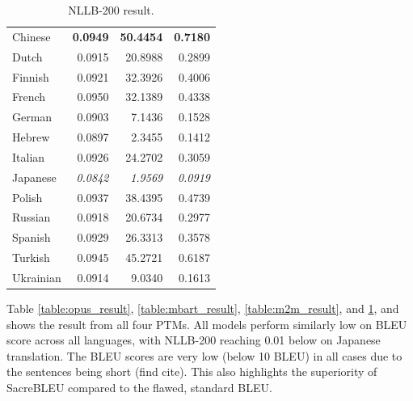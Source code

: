 \documentclass[a4paper, 11pt]{article}
\begin{document}
\begin{table}[htbp]
\begin{minipage}{0.49\linewidth}
\begin{tabular}{lrrr}
            \hline
            Chinese           & \textbf{0.0949} & \textbf{50.4454}   & \textbf{0.7180} \\
            Dutch             & 0.0915          & 20.8988            & 0.2899          \\
            Finnish           & 0.0921          & 32.3926            & 0.4006          \\
            French            & 0.0950          & 32.1389            & 0.4338          \\
            German            & 0.0903          & 7.1436             & 0.1528          \\
            Hebrew            & 0.0897          & 2.3455             & 0.1412          \\
            Italian           & 0.0926          & 24.2702            & 0.3059          \\
            Japanese          & \textit{0.0842} & \textit{1.9569}    & \textit{0.0919} \\
            Polish            & 0.0937          & 38.4395            & 0.4739          \\
            Russian           & 0.0918          & 20.6734            & 0.2977          \\
            Spanish           & 0.0929          & 26.3313            & 0.3578          \\
            Turkish           & 0.0945          & 45.2721            & 0.6187          \\
            Ukrainian         & 0.0914          & 9.0340             & 0.1613          \\
            \hline
        \end{tabular}
        \caption{NLLB-200 result.}
        \label{table:nllb_result}
    \end{minipage}
\end{table}

Table \ref{table:opus_result}, \ref{table:mbart_result}, \ref{table:m2m_result}, and \ref{table:nllb_result}, and  shows the result from all four PTMs. All models perform similarly low on BLEU score across all languages, with NLLB-200 reaching 0.01 below on Japanese translation. The BLEU scores are very low (below 10 BLEU) in all cases due to the sentences being short (find cite). This also highlights the superiority of SacreBLEU compared to the flawed, standard BLEU.

\end{document}
